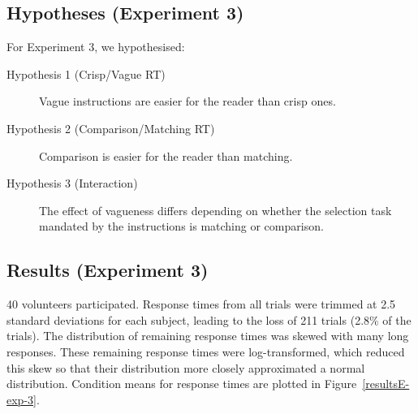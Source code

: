 \documentclass[ %
  graybox       %
 ,envcountchap  %
 ,sectrefs      %
]{svmono}
\begin{document}
\begin{table}
\centering
\caption{Experiment 3 instructions for the smallest array, arranged by condition. The instructions given in the table started with ``Choose a square with \ldots''}
\label{instructionsE-exp-3}
\end{table}

\subsection{Hypotheses (Experiment 3)}

For Experiment 3, we hypothesised:

\begin{description}
	\item [Hypothesis 1 (Crisp/Vague RT)] Vague instructions are easier for the reader than crisp ones.
	\item [Hypothesis 2 (Comparison/Matching RT)] Comparison is easier for the reader than matching.
	\item [Hypothesis 3 (Interaction)] The effect of vagueness differs depending on whether the selection task mandated by the instructions is matching or comparison.
\end{description}

\subsection{Results (Experiment 3)}

40 volunteers participated. Response times from all trials were trimmed at 2.5 standard deviations for each subject, leading to the loss of 211 trials (2.8\% of the trials). The distribution of remaining response times was skewed with many long responses. These remaining response times were log-transformed, which reduced this skew so that their distribution more closely approximated a normal distribution. Condition means for response times are plotted in Figure~\ref{resultsE-exp-3}.
\end{document}
